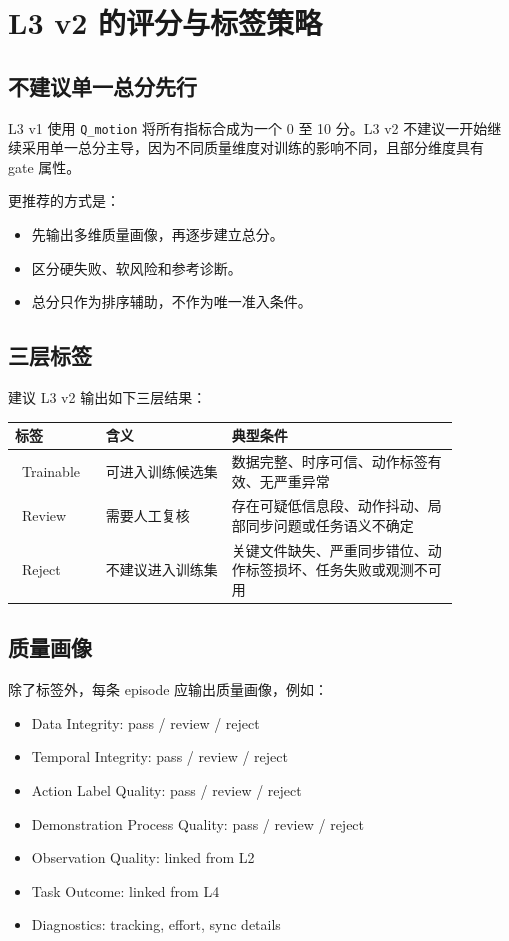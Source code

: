 \documentclass[UTF8,zihao=-4,oneside,openany]{ctexrep}
\newcommand{\Pass}{\textcolor{PassGreen}{\ding{51}}}
\newcommand{\Warn}{\textcolor{WarnOrange}{\ding{115}}}
\newcommand{\Reject}{\textcolor{RejectRed}{\ding{55}}}
\begin{document}
\section{L3 v2 的评分与标签策略}

\subsection{不建议单一总分先行}

L3 v1 使用 \texttt{Q\_motion} 将所有指标合成为一个 0 至 10 分。L3 v2 不建议一开始继续采用单一总分主导，因为不同质量维度对训练的影响不同，且部分维度具有 gate 属性。

更推荐的方式是：

\begin{itemize}
  \item 先输出多维质量画像，再逐步建立总分。
  \item 区分硬失败、软风险和参考诊断。
  \item 总分只作为排序辅助，不作为唯一准入条件。
\end{itemize}

\subsection{三层标签}

建议 L3 v2 输出如下三层结果：

\begin{longtable}{p{0.18\linewidth}p{0.25\linewidth}p{0.45\linewidth}}
\toprule
\textbf{标签} & \textbf{含义} & \textbf{典型条件} \\
\midrule
\Pass\ Trainable & 可进入训练候选集 & 数据完整、时序可信、动作标签有效、无严重异常 \\
\Warn\ Review & 需要人工复核 & 存在可疑低信息段、动作抖动、局部同步问题或任务语义不确定 \\
\Reject\ Reject & 不建议进入训练集 & 关键文件缺失、严重同步错位、动作标签损坏、任务失败或观测不可用 \\
\bottomrule
\end{longtable}

\subsection{质量画像}

除了标签外，每条 episode 应输出质量画像，例如：

\begin{itemize}
  \item Data Integrity: pass / review / reject
  \item Temporal Integrity: pass / review / reject
  \item Action Label Quality: pass / review / reject
  \item Demonstration Process Quality: pass / review / reject
  \item Observation Quality: linked from L2
  \item Task Outcome: linked from L4
  \item Diagnostics: tracking, effort, sync details
\end{itemize}
\end{document}
